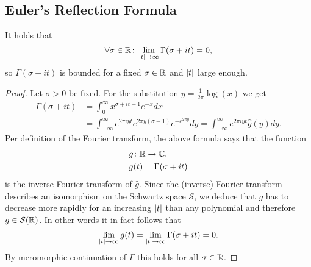 \subsection{Euler's Reflection Formula}


\begin{lemma}
	It holds that
\begin{equation*}
	\forall \sigma \in \mathbb{R} \colon \lim\limits_{\left|t\right| \to \infty} \Gamma(\sigma + i t) = 0,
\end{equation*}
	so $\Gamma(\sigma + i t)$ is bounded for a fixed $\sigma \in \mathbb{R}$ and $\left|t\right|$ large enough.
\end{lemma}
\begin{proof}
	Let $\sigma >0$ be fixed. For the substitution $y = \frac{1}{2 \pi} \log(x)$ we get
\begin{equation*}
\begin{aligned}	
	\Gamma(\sigma + i t)
	&= \int_0^\infty x^{\sigma + i t - 1} e^{-x} dx \\
	&= \int_{-\infty}^\infty e^{2 \pi i y t} e^{2 \pi y (\sigma - 1)} e^{-e^{2 \pi y}} dy = \int_{-\infty}^\infty e^{2 \pi i y t} \hat{g}(y) dy.
\end{aligned}
\end{equation*}
	Per definition of the Fourier transform, the above formula says that the function
\begin{equation*}
\begin{aligned}
	&g\colon \mathbb{R} \to \mathbb{C}, \\
	&g(t) = \Gamma(\sigma + i t)
\end{aligned}
\end{equation*}
	is the inverse Fourier transform of $\hat{g}$. Since the (inverse) Fourier transform describes an isomorphism on the Schwartz space $\mathcal{S}$, we deduce that $g$ has to decrease more rapidly for an increasing $\left|t\right|$ than any polynomial and therefore $g \in \mathcal{S}(\mathbb{R})$. In other words it in fact follows that
\begin{equation*}
	\lim\limits_{\left|t\right| \to \infty} g(t) = \lim\limits_{\left|t\right| \to \infty} \Gamma(\sigma + i t) = 0.
\end{equation*}
	By meromorphic continuation of $\Gamma$ this holds for all $\sigma \in \mathbb{R}$.
\end{proof}


